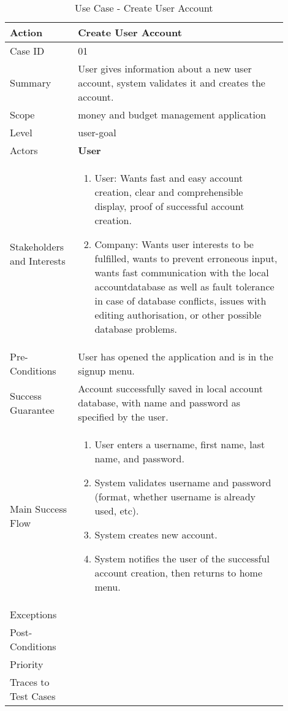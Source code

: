\documentclass[11pt]{article}
\newcounter{use case ID}
\newcommand\tabularhead[1]{
\begin{table}[ht]
    \addtocounter{use case ID}{1}
    \caption{Use Case \arabic{use case ID} - #1}
    \vspace{0.2cm}
    \begin{tabular}{|p{0.2\linewidth}|p{0.70\linewidth}|}
    \hline
        \textbf{Action} & \textbf{#1} \\
        \hline}
\newcommand\addrow[2]{#1 & #2\\ \hline}
\newcommand\addmulrow[2]{ \begin{minipage}[t][][t]{2.5cm}#1\end{minipage}
        &\begin{minipage}[t][][t]{11cm}
        \begin{enumerate}[itemsep=-1ex] #2   \end{enumerate}
    \end{minipage}\vfill\\ \hline}
\newenvironment{usecase}{\tabularhead}
{\hline\end{tabular}\end{table}}
\begin{document}
\begin{usecase}{Create User Account}
    \addrow{Case ID}{01}
    \addrow{Summary}{User gives information about a new user account, system validates it and creates the account.}
    \addrow{Scope}{money and budget management application}
    \addrow{Level}{user-goal}
    \addrow{Actors}{\textbf{User}}
    \addmulrow{Stakeholders and Interests}{
        \item User: Wants fast and easy account creation, clear and comprehensible display, proof of successful account creation.
        \item Company: Wants user interests to be fulfilled, wants to prevent erroneous input, wants fast communication with the local accountdatabase as well as fault tolerance in case of database conflicts, issues with editing authorisation, or other possible database problems.}
    \addrow{Pre-Conditions}{User has opened the application and is in the signup menu.}
    \addrow{Success Guarantee}{Account successfully saved in local account database, with name and password as specified by the user.}
    \addmulrow{Main Success Flow}{
        \item User enters a username, first name, last name, and password.
        \item System validates username and password (format, whether username is already used, etc).
        \item System creates new account.
        \item System notifies the user of the successful account creation, then returns to home menu.}
    \addrow{Exceptions}{}
    \addrow{Post-Conditions}{}
    \addrow{Priority}{}
    \addrow{Traces to Test Cases}{}
\end{usecase}
\end{document}
